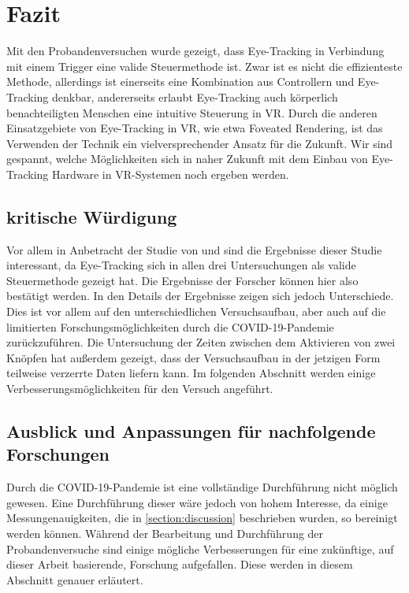 
\chapter{Fazit}
Mit den Probandenversuchen wurde gezeigt, dass Eye-Tracking in Verbindung mit einem Trigger eine valide Steuermethode ist. Zwar ist es nicht die effizienteste Methode, allerdings ist einerseits eine Kombination aus Controllern und Eye-Tracking denkbar, andererseits erlaubt Eye-Tracking auch körperlich benachteiligten Menschen eine intuitive Steuerung in VR. Durch die anderen Einsatzgebiete von Eye-Tracking in VR, wie etwa Foveated Rendering, ist das Verwenden der Technik ein vielversprechender Ansatz für die Zukunft. Wir sind gespannt, welche Möglichkeiten sich in naher Zukunft mit dem Einbau von Eye-Tracking Hardware in VR-Systemen noch ergeben werden.

\section{kritische Würdigung}
Vor allem in Anbetracht der Studie von \citeauthor{Pai.2019} und \citeauthor{D.Kumar.2016} sind die Ergebnisse dieser Studie interessant, da Eye-Tracking sich in allen drei Untersuchungen als valide Steuermethode gezeigt hat. Die Ergebnisse der Forscher können hier also bestätigt werden. In den Details der Ergebnisse zeigen sich jedoch Unterschiede. Dies ist vor allem auf den unterschiedlichen Versuchsaufbau, aber auch auf die limitierten Forschungsmöglichkeiten durch die COVID-19-Pandemie zurückzuführen. Die Untersuchung der Zeiten zwischen dem Aktivieren von zwei Knöpfen hat außerdem gezeigt, dass der Versuchsaufbau in der jetzigen Form teilweise verzerrte Daten liefern kann. Im folgenden Abschnitt werden einige Verbesserungsmöglichkeiten für den Versuch angeführt. 

\section{Ausblick und Anpassungen für nachfolgende Forschungen}
Durch die COVID-19-Pandemie ist eine vollständige Durchführung nicht möglich gewesen. Eine Durchführung dieser wäre jedoch von hohem Interesse, da einige Messungenauigkeiten, die in \autoref{section:discussion} beschrieben wurden, so bereinigt werden können. Während der Bearbeitung und Durchführung der Probandenversuche sind einige mögliche Verbesserungen für eine zukünftige, auf dieser Arbeit basierende, Forschung aufgefallen. Diese werden in diesem Abschnitt genauer erläutert. 
